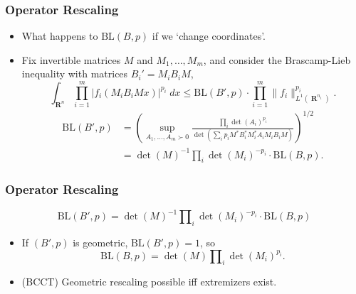\documentclass[usenames,dvipsnames,12pt]{beamer}
\DeclareMathOperator{\RR}{\mathbf{R}}
\begin{document}
\begin{frame}
    \frametitle{Operator Rescaling}

    \begin{itemize}
        \item What happens to $\text{BL}(B,p)$ if we `change coordinates'.

        \pause
        \item Fix invertible matrices $M$ and $M_1, \dots, M_m$, and consider the Brascamp-Lieb inequality with matrices $B_i' = M_i B_i M$,
        \[ \int_{\RR^n} \prod_{i = 1}^m |f_i(M_i B_i M x)|^{p_i}\; dx \leq \text{BL}(B',p) \cdot \prod_{i = 1}^m \| f_i \|_{L^1(\RR^{n_i})}^{p_i}. \]
        \pause
        \begin{align*}
            \text{BL}(B',p) &= \left( \sup_{A_1,\dots,A_m \succ 0} \frac{\prod_i \det(A_i)^{p_i}}{\det(\sum_i p_i M^* B_i^* M_i^* A_i M_i B_i M)} \right)^{1/2}\\
            &= \det(M)^{-1} \prod_i \det(M_i)^{-p_i} \cdot \text{BL}(B,p). 
        \end{align*}
    \end{itemize}
\end{frame}

\begin{frame}
    \frametitle{Operator Rescaling}

    \[ \text{BL}(B',p) = \det(M)^{-1} \prod\nolimits_i \det(M_i)^{-p_i} \cdot \text{BL}(B,p) \]

    \begin{itemize}
        \pause
        \item If $(B',p)$ is geometric, $\text{BL}(B',p) = 1$, so
        \[ \text{BL}(B,p) = \det(M) \prod\nolimits_i \det(M_i)^{p_i}. \]

        \pause
        \item (BCCT) Geometric rescaling possible iff extremizers exist.
    \end{itemize}
\end{frame}
\end{document}
